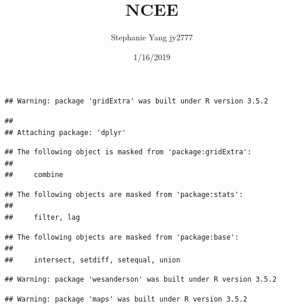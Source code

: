 \documentclass[]{article}
\title{NCEE}
\author{Stephanie Yang jy2777}
\date{1/16/2019}
\newenvironment{Shaded}{\begin{snugshade}}{\end{snugshade}}
\newcommand{\KeywordTok}[1]{\textcolor[rgb]{0.13,0.29,0.53}{\textbf{#1}}}
\newcommand{\DataTypeTok}[1]{\textcolor[rgb]{0.13,0.29,0.53}{#1}}
\newcommand{\DecValTok}[1]{\textcolor[rgb]{0.00,0.00,0.81}{#1}}
\newcommand{\StringTok}[1]{\textcolor[rgb]{0.31,0.60,0.02}{#1}}
\newcommand{\OtherTok}[1]{\textcolor[rgb]{0.56,0.35,0.01}{#1}}
\newcommand{\OperatorTok}[1]{\textcolor[rgb]{0.81,0.36,0.00}{\textbf{#1}}}
\newcommand{\NormalTok}[1]{#1}
\begin{document}
\maketitle

\begin{Shaded}
\end{Shaded}

\begin{verbatim}
## Warning: package 'gridExtra' was built under R version 3.5.2
\end{verbatim}

\begin{verbatim}
## 
## Attaching package: 'dplyr'
\end{verbatim}

\begin{verbatim}
## The following object is masked from 'package:gridExtra':
## 
##     combine
\end{verbatim}

\begin{verbatim}
## The following objects are masked from 'package:stats':
## 
##     filter, lag
\end{verbatim}

\begin{verbatim}
## The following objects are masked from 'package:base':
## 
##     intersect, setdiff, setequal, union
\end{verbatim}

\begin{verbatim}
## Warning: package 'wesanderson' was built under R version 3.5.2
\end{verbatim}

\begin{verbatim}
## Warning: package 'maps' was built under R version 3.5.2
\end{verbatim}
\end{document}
